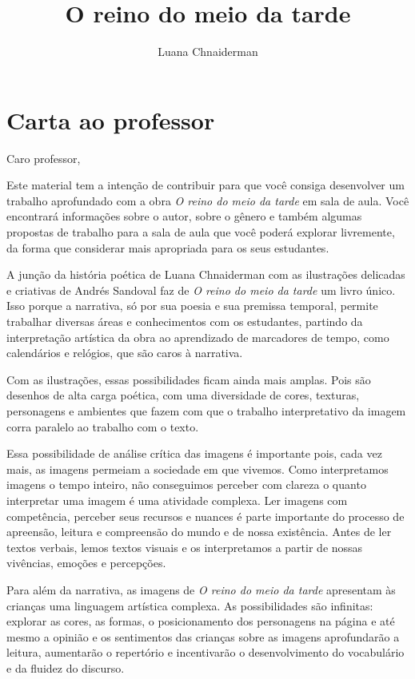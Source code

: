 \documentclass[11pt]{extarticle}
\newcommand{\AutorLivro}{Luana Chnaiderman}
\newcommand{\TituloLivro}{O reino do meio da tarde}
\newcommand{\colaborador}{Paulo Pompermaier}
\begin{document}
\title{\TituloLivro}
\author{\AutorLivro}
\def\authornotes{\colaborador}

\date{}
\maketitle

\tableofcontents

\section{Carta ao professor}

Caro professor,

Este material tem a intenção de contribuir para que você consiga desenvolver um trabalho aprofundado com a obra \textit{O reino do meio da tarde} em sala de aula.
Você encontrará informações sobre o autor, sobre o gênero e também 
algumas propostas de trabalho para a sala de aula que você poderá explorar livremente, 
da forma que considerar mais apropriada para os seus estudantes.

A junção da história poética de Luana Chnaiderman com as ilustrações delicadas e criativas de Andrés Sandoval faz de \textit{O reino do meio da tarde} um livro único. Isso porque a narrativa, só por sua poesia e sua premissa temporal, permite trabalhar diversas áreas e conhecimentos com os estudantes, partindo da interpretação artística da obra ao aprendizado de marcadores de tempo, como calendários e relógios, que são caros à narrativa.

Com as ilustrações, essas possibilidades ficam ainda mais amplas. Pois são desenhos de alta carga poética, com uma diversidade de cores, texturas, personagens e ambientes que fazem com que o trabalho interpretativo da imagem corra paralelo ao trabalho com o texto. 

Essa possibilidade de análise crítica das imagens é importante pois, cada vez mais, as imagens permeiam a sociedade em que vivemos. Como interpretamos 
imagens o tempo inteiro, não conseguimos perceber com clareza o quanto 
interpretar uma imagem é uma atividade complexa. Ler imagens com competência, 
perceber seus recursos e nuances é parte importante do processo de apreensão, 
leitura e compreensão do mundo e de nossa existência. Antes de ler textos 
verbais, lemos textos visuais e os interpretamos a partir de nossas vivências, 
emoções e percepções.

Para além da narrativa, as imagens de \textit{O reino do meio da tarde} 
apresentam às crianças uma linguagem artística complexa.
As possibilidades são infinitas: explorar as cores, as formas, o posicionamento dos personagens na página e até mesmo a opinião e os sentimentos das crianças sobre as imagens 
aprofundarão a leitura, aumentarão o repertório e incentivarão o desenvolvimento do vocabulário e da fluidez do discurso.
\end{document}
